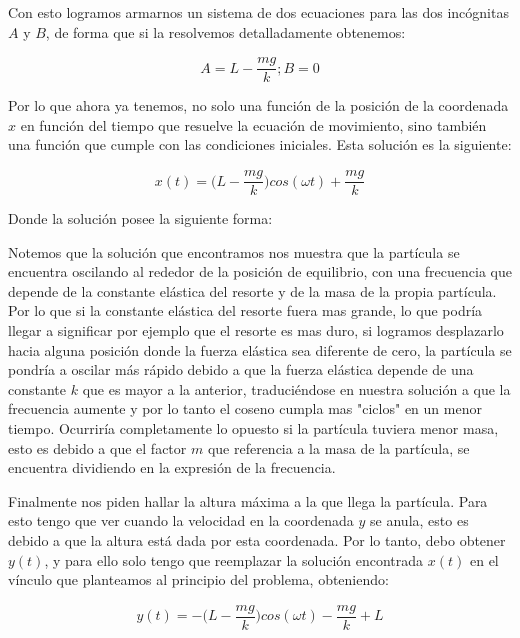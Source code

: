 \documentclass{article}
\begin{document}
Con esto logramos armarnos un sistema de dos ecuaciones para las dos incógnitas $A$ y $B$, de forma que si la resolvemos detalladamente obtenemos:

\begin{equation}
    A = L - \frac{mg}{k} ; B = 0
\end{equation}

Por lo que ahora ya tenemos, no solo una función de la posición de la coordenada $x$ en función del tiempo que resuelve la ecuación de movimiento, sino también una función que cumple con las condiciones iniciales. Esta solución es la siguiente:

\begin{equation}
    x(t) = \bigg( L - \frac{mg}{k} \bigg)cos(\omega t) + \frac{mg}{k}
\end{equation}

Donde la solución posee la siguiente forma:

\begin{figure}
    
\end{figure}

Notemos que la solución que encontramos nos muestra que la partícula se encuentra oscilando al rededor de la posición de equilibrio, con una frecuencia que depende de la constante elástica del resorte y de la masa de la propia partícula. Por lo que si la constante elástica del resorte fuera mas grande, lo que podría llegar a significar por ejemplo que el resorte es mas duro, si logramos desplazarlo hacia alguna posición donde la fuerza elástica sea diferente de cero, la partícula se pondría a oscilar más rápido debido a que la fuerza elástica depende de una constante $k$ que es mayor a la anterior, traduciéndose en nuestra solución a que la frecuencia aumente y por lo tanto el coseno cumpla mas "ciclos" en un menor tiempo. Ocurriría completamente lo opuesto si la partícula tuviera menor masa, esto es debido a que el factor $m$ que referencia a la masa de la partícula, se encuentra dividiendo en la expresión de la frecuencia.

Finalmente nos piden hallar la altura máxima a la que llega la partícula. Para esto tengo que ver cuando la velocidad en la coordenada $y$ se anula, esto es debido a que la altura está dada por esta coordenada. Por lo tanto,  debo obtener $y(t)$, y para ello solo tengo que reemplazar la solución encontrada $x(t)$ en el vínculo que planteamos al principio del problema, obteniendo:

\begin{equation}
    y(t) = - \bigg( L - \frac{mg}{k} \bigg)cos(\omega t) - \frac{mg}{k} + L
\end{equation}
\end{document}
